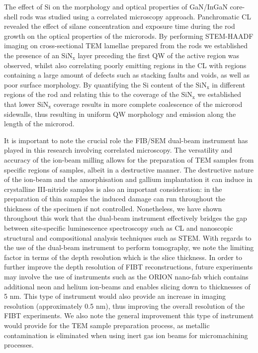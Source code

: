 The effect of Si on the morphology and optical properties of GaN/InGaN core-shell rods was studied using a correlated microscopy approach. Panchromatic CL revealed the effect of silane concentration and exposure time during the rod growth on the optical properties of the microrods. By performing STEM-HAADF imaging on cross-sectional TEM lamellae prepared from the rods we established the presence of an $\mathrm{SiN_{x}}$ layer preceding the first QW of the active region was observed, whilst also correlating poorly emitting regions in the CL with regions containing a large amount of defects such as stacking faults and voids, as well as poor surface morphology. By quantifying the Si content of the $\mathrm{SiN_{x}}$ in different regions of the rod and relating this to the coverage of the $\mathrm{SiN_{x}}$ we established that lower $\mathrm{SiN_{x}}$ coverage results in more complete coalescence of the microrod sidewalls, thus resulting in uniform QW morphology and emission along the length of the microrod.

It is important to note the crucial role the FIB/SEM dual-beam instrument has played in this research involving correlated microscopy. The versatility and accuracy of the ion-beam milling allows for the preparation of TEM samples from specific regions of samples, albeit in a destructive manner. The destructive nature of the ion-beam and the amorphisation and gallium implantation it can induce in crystalline III-nitride samples is also an important consideration: in the preparation of thin samples the induced damage can run throughout the thickness of the specimen if not controlled. Nonetheless, we have shown throughout this work that the dual-beam instrument effectively bridges the gap between site-specific luminescence spectroscopy such as CL and nanoscopic structural and compositional analysis techniques such as STEM. With regards to the use of the dual-beam instrument to perform tomography, we note the limiting factor in terms of the depth resolution which is the slice thickness. In order to further improve the depth resolution of FIBT reconstructions, future experiments may involve the use of instruments such as the ORION nano-fab which contains additional neon and helium ion-beams and enables slicing down to thicknesses of 5 nm. This type of instrument would also provide an increase in imaging resolution (approximately 0.5 nm), thus improving the overall resolution of the FIBT experiments. We also note the general improvement this type of instrument would provide for the TEM sample preparation process, as metallic contamination is eliminated when using inert gas ion beams for micromachining processes.

